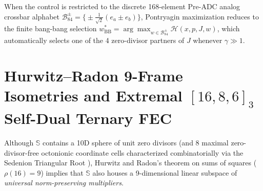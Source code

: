 \documentclass[journal,twoside]{IEEEtran}
\theoremstyle{definition}
\theoremstyle{remark}
\newcommand{\Se}{\mathbb{S}}
\begin{document}
When the control is restricted to the discrete 168-element Pre-ADC analog crossbar alphabet $\mathcal{B}_{84}^{\pm} = \bigl\{\pm\frac{1}{\sqrt{2}}(e_a \pm e_b)\bigr\}$, Pontryagin maximization reduces to the finite bang-bang selection $w^*_{\mathrm{BB}} = \arg\max_{w \in \mathcal{B}_{84}^{\pm}} \mathcal{H}(x, p, J, w)$, which automatically selects one of the 4 zero-divisor partners of $J$ whenever $\gamma \gg 1$.

\section{Hurwitz--Radon 9-Frame Isometries and Extremal $[16, 8, 6]_3$ Self-Dual Ternary FEC}
\label{sec:hurwitz_radon}
Although $\Se$ contains a 10D sphere of unit zero divisors (and 8 maximal zero-divisor-free octonionic coordinate cells characterized combinatorially via the Sedenion Triangular Root \cite{Agourakis2026Triangular,Agourakis2026FreeCells}), Hurwitz and Radon's theorem on sums of squares ($\rho(16) = 9$) implies that $\Se$ also houses a 9-dimensional linear subspace of \emph{universal norm-preserving multipliers}.
\end{document}
